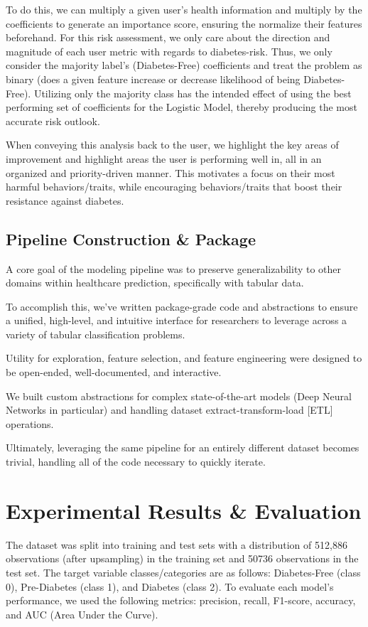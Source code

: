 \documentclass[conference]{IEEEtran}
\begin{document}
        To do this, we can multiply a given user's health information and multiply by the coefficients to generate an importance score, ensuring the normalize their features beforehand. For this risk assessment, we only care about the direction and magnitude of each user metric with regards to diabetes-risk. Thus, we only consider the majority label's (Diabetes-Free) coefficients and treat the problem as binary (does a given feature increase or decrease likelihood of being Diabetes-Free). Utilizing only the majority class has the intended effect of using the best performing set of coefficients for the Logistic Model, thereby producing the most accurate risk outlook.

        When conveying this analysis back to the user, we highlight the key areas of improvement and highlight areas the user is performing well in, all in an organized and priority-driven manner. This motivates a focus on their most harmful behaviors/traits, while encouraging behaviors/traits that boost their resistance against diabetes.

    \subsection{Pipeline Construction \& Package}
    A core goal of the modeling pipeline was to preserve generalizability to other domains within healthcare prediction, specifically with tabular data.
    
    To accomplish this, we've written package-grade code and abstractions to ensure a unified, high-level, and intuitive interface for researchers to leverage across a variety of tabular classification problems.
    
    Utility for exploration, feature selection, and feature engineering were designed to be open-ended, well-documented, and interactive.

    We built custom abstractions for complex state-of-the-art models (Deep Neural Networks in particular) and handling dataset extract-transform-load [ETL] operations.

    Ultimately, leveraging the same pipeline for an entirely different dataset becomes trivial, handling all of the code necessary to quickly iterate.
        

\section{Experimental Results \& Evaluation}\label{sec:eval}
The dataset was split into training and test sets with a distribution of 512,886 observations (after upsampling) in the training set and 
50736 observations in the test set. The target variable 
classes/categories are as follows: Diabetes-Free (class 0), 
Pre-Diabetes (class 1), and Diabetes (class 2). To evaluate 
each model's performance, we used the following metrics: 
precision, recall, F1-score, accuracy, and AUC (Area Under the 
Curve).
\end{document}
